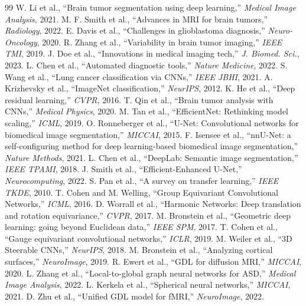 \documentclass[10pt,twocolumn,letterpaper]{article}
\begin{document}
\begin{thebibliography}{99}
 W. Li et al., ``Brain tumor segmentation using deep learning,'' \textit{Medical Image Analysis}, 2021.
 M. F. Smith et al., ``Advances in MRI for brain tumors,'' \textit{Radiology}, 2022.
 E. Davis et al., ``Challenges in glioblastoma diagnosis,'' \textit{Neuro-Oncology}, 2020.
 R. Zhang et al., ``Variability in brain tumor imaging,'' \textit{IEEE TMI}, 2019.
 J. Doe et al., ``Innovations in medical imaging tech,'' \textit{J. Biomed. Sci.}, 2023.
 L. Chen et al., ``Automated diagnostic tools,'' \textit{Nature Medicine}, 2022.
 S. Wang et al., ``Lung cancer classification via CNNs,'' \textit{IEEE JBHI}, 2021.
 A. Krizhevsky et al., ``ImageNet classification,'' \textit{NeurIPS}, 2012.
 K. He et al., ``Deep residual learning,'' \textit{CVPR}, 2016.
 T. Qin et al., ``Brain tumor analysis with CNNs,'' \textit{Medical Physics}, 2020.
 M. Tan et al., ``EfficientNet: Rethinking model scaling,'' \textit{ICML}, 2019.
 O. Ronneberger et al., ``U-Net: Convolutional networks for biomedical image segmentation,'' \textit{MICCAI}, 2015.
 F. Isensee et al., ``nnU-Net: a self-configuring method for deep learning-based biomedical image segmentation,'' \textit{Nature Methods}, 2021.
 L. Chen et al., ``DeepLab: Semantic image segmentation,'' \textit{IEEE TPAMI}, 2018.
 J. Smith et al., ``Efficient-Enhanced U-Net,'' \textit{Neurocomputing}, 2022.
 S. Pan et al., ``A survey on transfer learning,'' \textit{IEEE TKDE}, 2010.
 T. Cohen and M. Welling, ``Group Equivariant Convolutional Networks,'' \textit{ICML}, 2016.
 D. Worrall et al., ``Harmonic Networks: Deep translation and rotation equivariance,'' \textit{CVPR}, 2017.
 M. Bronstein et al., ``Geometric deep learning: going beyond Euclidean data,'' \textit{IEEE SPM}, 2017.
 T. Cohen et al., ``Gauge equivariant convolutional networks,'' \textit{ICLR}, 2019.
 M. Weiler et al., ``3D Steerable CNNs,'' \textit{NeurIPS}, 2018.
 M. Bronstein et al., ``Analyzing cortical surfaces,'' \textit{NeuroImage}, 2019.
 R. Ewert et al., ``GDL for diffusion MRI,'' \textit{MICCAI}, 2020.
 L. Zhang et al., ``Local-to-global graph neural networks for ASD,'' \textit{Medical Image Analysis}, 2022.
 L. Kerkela et al., ``Spherical neural networks,'' \textit{MICCAI}, 2021.
 D. Zhu et al., ``Unified GDL model for fMRI,'' \textit{NeuroImage}, 2022.

\end{thebibliography}
\end{document}
